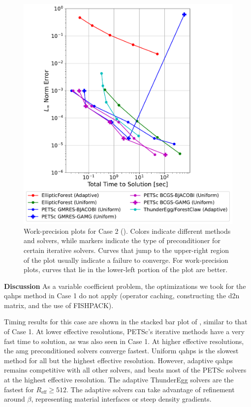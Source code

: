 \begin{figure}
    \centering
    \includegraphics[width=1.0\textwidth, clip=true, trim={0 0 0 0}]{figures/case02-work-precision-plots-no-title.pdf}
    \caption{Work-precision plots for Case 2 (). Colors indicate different methods and solvers, while markers indicate the type of preconditioner for certain iterative solvers. Curves that jump to the upper-right region of the plot usually indicate a failure to converge. For work-precision plots, curves that lie in the lower-left portion of the plot are better.}
    \label{fig:case02-work-precision-plot}
\end{figure}

{\bf Discussion}
As a variable coefficient problem, the optimizations we took for the \gls{qahps} method in Case 1 do not apply (operator caching, constructing the \gls{d2n} matrix, and the use of FISHPACK).

Timing results for this case are shown in the stacked bar plot of , similar to that of Case 1. At lower effective resolutions, PETSc's iterative methods have a very fast time to solution, as was also seen in Case 1. At higher effective resolutions, the \gls{amg} preconditioned solvers converge fastest. Uniform \gls{qahps} is the slowest method for all but the highest effective resolution. However, adaptive \gls{qahps} remains competitive with all other solvers, and beats most of the PETSc solvers at the highest effective resolution. The adaptive ThunderEgg solvers are the fastest for $R_{\text{eff}} \ge 512$. The adaptive solvers can take advantage of refinement around $\beta$, representing material interfaces or steep density gradients.


